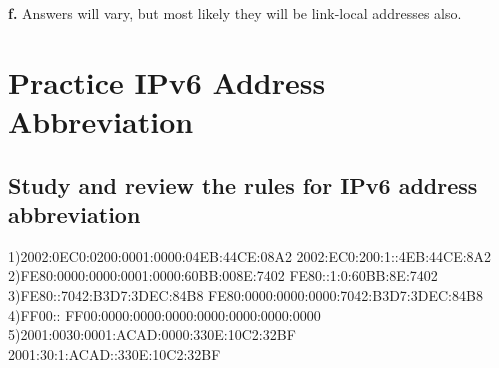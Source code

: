 \documentclass[conference]{IEEEtran}
\begin{document}
\textbf{f.} Answers will vary, but most likely they will be link-local addresses also.

\section{Practice IPv6 Address Abbreviation}
\subsection{Study and review the rules for IPv6 address abbreviation}
1)2002:0EC0:0200:0001:0000:04EB:44CE:08A2
2002:EC0:200:1::4EB:44CE:8A2\\

2)FE80:0000:0000:0001:0000:60BB:008E:7402
FE80::1:0:60BB:8E:7402\\

3)FE80::7042:B3D7:3DEC:84B8
FE80:0000:0000:0000:7042:B3D7:3DEC:84B8\\

4)FF00::
FF00:0000:0000:0000:0000:0000:0000:0000\\

5)2001:0030:0001:ACAD:0000:330E:10C2:32BF
2001:30:1:ACAD::330E:10C2:32BF\\
\end{document}

